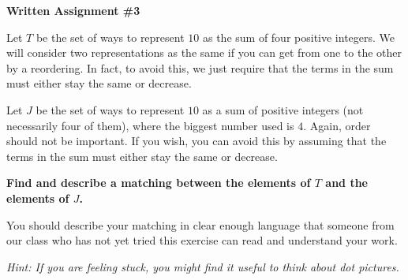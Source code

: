 \documentclass[12pt,letterpaper]{article}
\begin{document}
\setlength{\parskip}{1ex plus 0.5ex minus 0.2ex}
\setlength{\parindent}{0pt}

\pagestyle{fancy}
\lfoot{}
\rfoot{}

\begin{center}
{
\Large
\textbf{Written Assignment \#3}
}
\end{center}

Let $T$ be the set of ways to represent $10$ as the sum of four positive integers. 
We will consider two representations as the same if you can get from one to the other by  a reordering. 
In fact, to avoid this, we just require that the terms in the sum must either stay the same or decrease.

Let $J$ be the set of ways to represent $10$ as a sum of positive integers (not necessarily four of them), where the biggest number used is $4$.
Again, order should not be important.
If you wish, you can avoid this by assuming that the terms in the sum must either stay the same or decrease.

\textbf{Find and describe a matching between the elements of $T$ and the elements of $J$.}

You should describe your matching in clear enough language that someone from our class who has not yet tried this exercise can read and understand your work.

\vspace{1in}

\textit{Hint: If you are feeling stuck, you might find it useful to think about dot pictures.}
\end{document}
